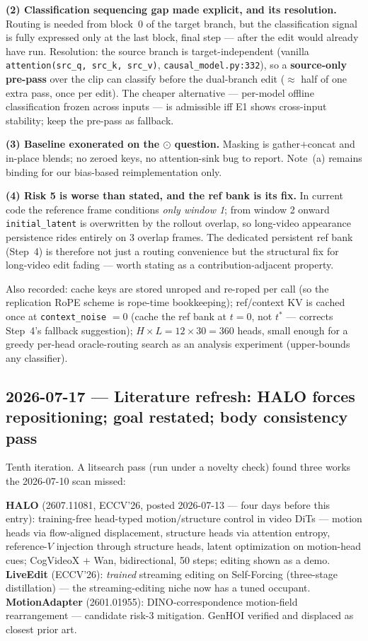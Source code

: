 \documentclass{article}
\begin{document}
\textbf{(2) Classification sequencing gap made explicit, and its resolution.}
Routing is needed from block~0 of the target branch, but the classification
signal is fully expressed only at the last block, final step --- after the edit
would already have run. Resolution: the source branch is target-independent
(vanilla \texttt{attention(src\_q, src\_k, src\_v)},
\texttt{causal\_model.py:332}), so a \textbf{source-only pre-pass} over the clip
can classify before the dual-branch edit ($\approx$ half of one extra pass, once
per edit). The cheaper alternative --- per-model offline classification frozen
across inputs --- is admissible iff E1 shows cross-input stability; keep the
pre-pass as fallback.

\textbf{(3) Baseline exonerated on the $\odot$ question.} Masking is
gather$+$concat and in-place blends; no zeroed keys, no attention-sink bug to
report. Note~(a) remains binding for our bias-based reimplementation only.

\textbf{(4) Risk 5 is worse than stated, and the ref bank is its fix.} In
current code the reference frame conditions \emph{only window 1}; from window 2
onward \texttt{initial\_latent} is overwritten by the rollout overlap, so
long-video appearance persistence rides entirely on 3 overlap frames. The
dedicated persistent ref bank (Step~4) is therefore not just a routing
convenience but the structural fix for long-video edit fading --- worth stating
as a contribution-adjacent property.

Also recorded: cache keys are stored unroped and re-roped per call (so the
replication RoPE scheme is rope-time bookkeeping); ref/context KV is cached once
at \texttt{context\_noise} $= 0$ (cache the ref bank at $t = 0$, not
$t^{*}$ --- corrects Step~4's fallback suggestion); $H{\times}L = 12 \times 30 =
360$ heads, small enough for a greedy per-head oracle-routing search as an
analysis experiment (upper-bounds any classifier).

\subsection*{2026-07-17 --- Literature refresh: HALO forces repositioning; goal restated; body consistency pass}

Tenth iteration. A litsearch pass (run under a novelty check) found three works
the 2026-07-10 scan missed:

\textbf{HALO} (2607.11081, ECCV'26, posted 2026-07-13 --- four days before
this entry): training-free head-typed motion/structure control in video DiTs
--- motion heads via flow-aligned displacement, structure heads via attention
entropy, reference-$V$ injection through structure heads, latent optimization
on motion-head cues; CogVideoX $+$ Wan, bidirectional, 50 steps; editing shown
as a demo. \textbf{LiveEdit} (ECCV'26): \emph{trained} streaming editing on
Self-Forcing (three-stage distillation) --- the streaming-editing niche now
has a tuned occupant. \textbf{MotionAdapter} (2601.01955):
DINO-correspondence motion-field rearrangement --- candidate risk-3
mitigation. GenHOI verified and displaced as closest prior art.
\end{document}
